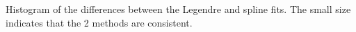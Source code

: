 Histogram of the differences between the Legendre and spline fits.  The small size indicates that the 2 methods are consistent. \label{resid_fits}